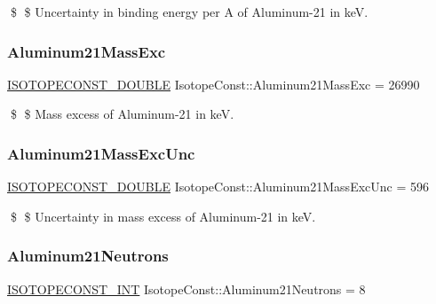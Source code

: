 \$ \$ Uncertainty in binding energy per A of Aluminum-\/21 in keV. \mbox{\label{group___isotope_const-_aluminum-_al21_ga62a4da80db275044bea6860d6102933c}} 
\subsubsection{\texorpdfstring{Aluminum21\+Mass\+Exc}{Aluminum21MassExc}}
{\footnotesize\ttfamily \mbox{\hyperlink{group___isotope_const-_macros_ga8f45a7272ce02c0b4c65c44636ed719a}{I\+S\+O\+T\+O\+P\+E\+C\+O\+N\+S\+T\+\_\+\+D\+O\+U\+B\+LE}} Isotope\+Const\+::\+Aluminum21\+Mass\+Exc = 26990}

\$ \$ Mass excess of Aluminum-\/21 in keV. \mbox{\label{group___isotope_const-_aluminum-_al21_gac235aa794eff0be1cadc99ac32c505ea}} 
\subsubsection{\texorpdfstring{Aluminum21\+Mass\+Exc\+Unc}{Aluminum21MassExcUnc}}
{\footnotesize\ttfamily \mbox{\hyperlink{group___isotope_const-_macros_ga8f45a7272ce02c0b4c65c44636ed719a}{I\+S\+O\+T\+O\+P\+E\+C\+O\+N\+S\+T\+\_\+\+D\+O\+U\+B\+LE}} Isotope\+Const\+::\+Aluminum21\+Mass\+Exc\+Unc = 596}

\$ \$ Uncertainty in mass excess of Aluminum-\/21 in keV. \mbox{\label{group___isotope_const-_aluminum-_al21_gaba503b7b63a02edcc787d2d304d92e2a}} 
\subsubsection{\texorpdfstring{Aluminum21\+Neutrons}{Aluminum21Neutrons}}
{\footnotesize\ttfamily \mbox{\hyperlink{group___isotope_const-_macros_ga5f18360b3e99483a35c32d789e62621c}{I\+S\+O\+T\+O\+P\+E\+C\+O\+N\+S\+T\+\_\+\+I\+NT}} Isotope\+Const\+::\+Aluminum21\+Neutrons = 8}

